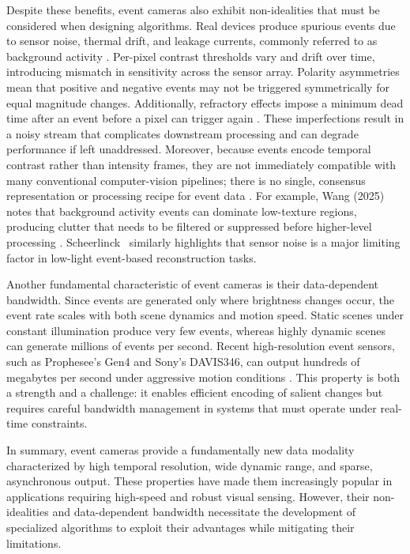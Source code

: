 Despite these benefits, event cameras also exhibit non-idealities that must be considered when designing algorithms. Real devices produce spurious events due to sensor noise, thermal drift, and leakage currents, commonly referred to as background activity \cite{Gallego2020Survey}. Per-pixel contrast thresholds vary and drift over time, introducing mismatch in sensitivity across the sensor array. Polarity asymmetries mean that positive and negative events may not be triggered symmetrically for equal magnitude changes. Additionally, refractory effects impose a minimum dead time after an event before a pixel can trigger again \cite{Delbruck2020Handbook}. These imperfections result in a noisy stream that complicates downstream processing and can degrade performance if left unaddressed. Moreover, because events encode temporal contrast rather than intensity frames, they are not immediately compatible with many conventional computer-vision pipelines; there is no single, consensus representation or processing recipe for event data \cite{Gallego2020Survey}. For example, Wang (2025) notes that background activity events can dominate low-texture regions, producing clutter that needs to be filtered or suppressed before higher-level processing \cite{Wang2025Thesis}. Scheerlinck~\cite{Scheerlinck2021Thesis} similarly highlights that sensor noise is a major limiting factor in low-light event-based reconstruction tasks.

Another fundamental characteristic of event cameras is their data-dependent bandwidth. Since events are generated only where brightness changes occur, the event rate scales with both scene dynamics and motion speed. Static scenes under constant illumination produce very few events, whereas highly dynamic scenes can generate millions of events per second. Recent high-resolution event sensors, such as Prophesee’s Gen4 and Sony’s DAVIS346, can output hundreds of megabytes per second under aggressive motion conditions \cite{Finateu2020ISSCC}. This property is both a strength and a challenge: it enables efficient encoding of salient changes but requires careful bandwidth management in systems that must operate under real-time constraints.

In summary, event cameras provide a fundamentally new data modality characterized by high temporal resolution, wide dynamic range, and sparse, asynchronous output. These properties have made them increasingly popular in applications requiring high-speed and robust visual sensing. However, their non-idealities and data-dependent bandwidth necessitate the development of specialized algorithms to exploit their advantages while mitigating their limitations.

